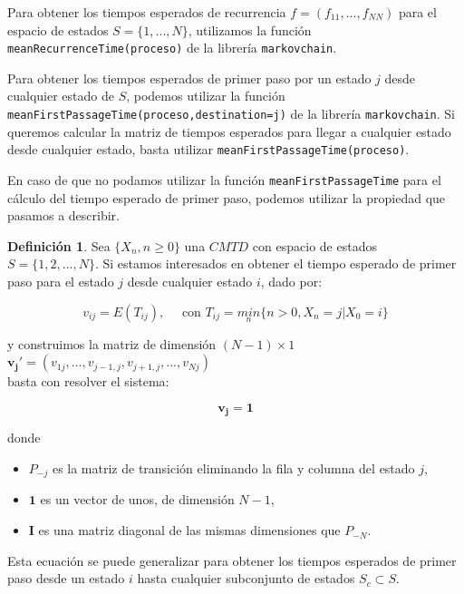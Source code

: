 \documentclass[
]{book}
\providecommand{\tightlist}{%
  \setlength{\itemsep}{0pt}\setlength{\parskip}{0pt}}
\newenvironment{yellowbox}{
  \definecolor{shadecolor}{rgb}{210, 180, 140}  
  \color{black}
  \begin{shaded}}
 {\end{shaded}}
\newenvironment{whitebox}{
  \definecolor{shadecolor}{rgb}{255, 255, 255}  
  \color{black}
  \begin{shaded}}
 {\end{shaded}}
\theoremstyle{definition}
\newtheorem{definition}{Definición}[chapter]
\theoremstyle{definition}
\theoremstyle{definition}
\theoremstyle{definition}
\theoremstyle{remark}
\begin{document}
\begin{whitebox}
Para obtener los tiempos esperados de recurrencia \(f=(f_{11},...,f_{NN})\) para el espacio de estados \(S=\{1,...,N\}\), utilizamos la función \texttt{meanRecurrenceTime(proceso)} de la librería \texttt{markovchain}.

Para obtener los tiempos esperados de primer paso por un estado \(j\) desde cualquier estado de \(S\), podemos utilizar la función \texttt{meanFirstPassageTime(proceso,destination=j)} de la librería \texttt{markovchain}.
Si queremos calcular la matriz de tiempos esperados para llegar a cualquier estado desde cualquier estado, basta utilizar \texttt{meanFirstPassageTime(proceso)}.

\end{whitebox}

En caso de que no podamos utilizar la función \texttt{meanFirstPassageTime} para el cálculo del tiempo esperado de primer paso, podemos utilizar la propiedad que pasamos a describir.

\begin{yellowbox}

\begin{definition}
Sea \(\{X_n, n \geq 0\}\) una \(CMTD\) con espacio de estados \(S = \{1, 2,...,N\}\). Si estamos interesados en obtener el tiempo esperado de primer paso para el estado \(j\) desde cualquier estado \(i\), dado por:

\[v_{ij} = E(T_{ij}), \quad \text{ con } T_{ij} = \underset{n}{min}\{n > 0, X_n = j | X_0 = i\}\]

y construimos la matriz de dimensión \((N-1) \times 1\) \(\mathbf{v_j'}=(v_{1j},...,v_{j-1,j},v_{j+1,j},...,v_{Nj})\)\\
basta con resolver el sistema:

\begin{equation}
[\mathbf{I} - P_{-j}]\mathbf{v_j} = \mathbf{1}
\label{eq:primerpaso-ecu}
\end{equation}

donde

\begin{itemize}
\tightlist
\item
  \(P_{-j}\) es la matriz de transición eliminando la fila y columna del estado \(j\),
\item
  \(\mathbf{1}\) es un vector de unos, de dimensión \(N-1\),
\item
  \(\mathbf{I}\) es una matriz diagonal de las mismas dimensiones que \(P_{-N}\).
\end{itemize}

Esta ecuación se puede generalizar para obtener los tiempos esperados de primer paso desde un estado \(i\) hasta cualquier subconjunto de estados \(S_c \subset S\).
\end{definition}

\end{yellowbox}
\end{document}
